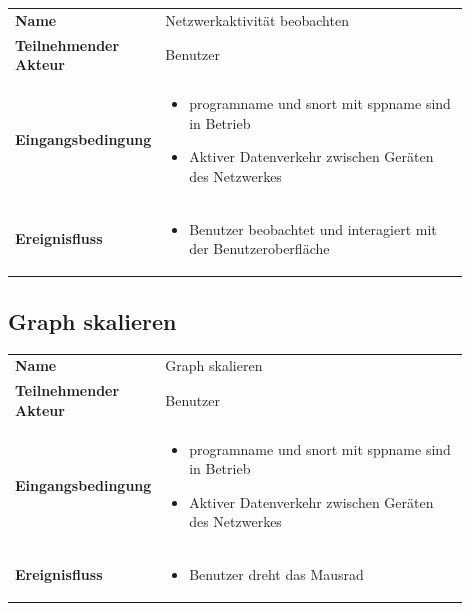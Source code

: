 \begin{tabular}{lp{0.9\linewidth}}
\textbf{Name} & Netzwerkaktivität beobachten \\

\textbf{Teilnehmender Akteur} & Benutzer \\

\textbf{Eingangsbedingung} &
				\begin{minipage}[t]{\linewidth}
				\begin{itemize}[nosep,after=\strut,leftmargin=10pt]

				\item \gls{programname} und \gls{snort} mit \gls{sppname} sind in Betrieb
				\item Aktiver Datenverkehr zwischen Geräten des Netzwerkes

				\end{itemize}
				\end{minipage} \\
\textbf{Ereignisfluss} &
				\begin{minipage}[t]{\linewidth}
				\begin{itemize}[nosep,after=\strut,leftmargin=10pt]

				\item Benutzer beobachtet und interagiert mit der Benutzeroberfläche
				\end{itemize}
				\end{minipage} \\

\end{tabular}

\subsection{Graph skalieren}

\begin{tabular}{lp{0.9\linewidth}}
\textbf{Name} & Graph skalieren \\

\textbf{Teilnehmender Akteur} & Benutzer \\

\textbf{Eingangsbedingung} &
				\begin{minipage}[t]{\linewidth}
				\begin{itemize}[nosep,after=\strut,leftmargin=10pt]

				\item \gls{programname} und \gls{snort} mit \gls{sppname} sind in Betrieb
				\item Aktiver Datenverkehr zwischen Geräten des Netzwerkes

				\end{itemize}
				\end{minipage} \\
\textbf{Ereignisfluss} &
				\begin{minipage}[t]{\linewidth}
				\begin{itemize}[nosep,after=\strut,leftmargin=10pt]
				\item Benutzer dreht das Mausrad
				\end{itemize}
				\end{minipage} \\
\end{tabular}

